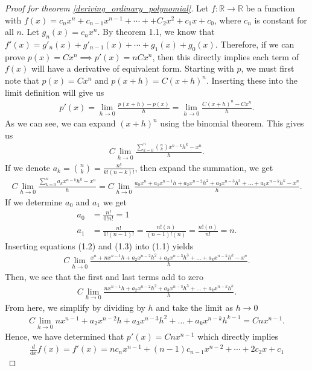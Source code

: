 \begin{proof}[Proof for theorem \ref{deriving_ordinary_polynomial}]
	Let $f:\mathbb{R}\rightarrow\mathbb{R}$ be a function with $f(x)=c_nx^n+c_{n-1}x^{n-1}+\cdots++C_2x^2+c_1x+c_0$, where $c_n$ is constant for all $n$. Let $g_n(x)=c_nx^n$. By theorem 1.1, we know that $f'(x)=g'_n(x)+g'_{n-1}(x)+\cdots+g_1(x)+g_0(x)$. Therefore, if we can prove $p(x)=Cx^n\implies p'(x)=nCx^n$, then this directly implies each term of $f(x)$ will have a derivative of equivalent form.
	Starting with $p$, we must first note that $p(x)=Cx^n$ and $p(x+h)=C(x+h)^n$. Inserting these into the limit definition will give us 
	\begin{align*}
	p'(x) = \lim_{h\to0} \frac{p(x+h)-p(x)}{h} = \lim_{h\to0} \frac{C(x+h)^n-Cx^n}{h}.
	\end{align*}
	As we can see, we can expand $(x+h)^n$ using the binomial theorem. This gives us
	\begin{align*}
	C\lim_{h\to0} \frac{\sum\limits_{k=0}^{n}{{n}\choose{k}}x^{n-k}h^k-x^n}{h}.
	\end{align*}
	If we denote $a_k={{n}\choose{k}}=\frac{n!}{k!(n-k)!}$, then expand the summation, we get
	\begin{align}
	C\lim_{h\to0}\frac{\sum\limits_{k=0}^{n}a_kx^{n-k}h^k-x^n}{h}=C\lim_{h\to0}\frac{a_0x^{n}+a_1x^{n-1}h+a_2x^{n-2}h^2+a_3x^{n-3}h^3+\dots+a_kx^{n-k}h^k-x^n}{h}.
	\end{align}
	If we determine $a_0$ and $a_1$ we get
	\begin{align}
	a_0 &=\frac{n!}{0!n!}=1 \\
	a_1 &=\frac{n!}{1!(n-1)!} =\frac{n!(n)}{(n-1)!(n)}=\frac{n!(n)}{n!}=n.
	\end{align}
	Inserting equations (1.2) and (1.3) into (1.1) yields
	\begin{align*}
	C\lim_{h\to0}\frac{x^n+nx^{n-1}h+a_2x^{n-2}h^2+a_3x^{n-3}h^3+\dots+a_kx^{n-k}h^k-x^n}{h}.
	\end{align*}
	Then, we see that the first and last terms add to zero
	\begin{align*}
	C\lim_{h\to0}\frac{nx^{n-1}h+a_2x^{n-2}h^2+a_3x^{n-3}h^3+\dots+a_kx^{n-k}h^k}{h}.
	\end{align*}
	From here, we simplify by dividing by $h$ and take the limit as $h \to 0$
	\begin{align*}
	C\lim_{h\to0}nx^{n-1}+a_2x^{n-2}h+a_3x^{n-3}h^2+\dots+a_kx^{n-k}h^{k-1}=Cnx^{n-1}.
	\end{align*}
	Hence, we have determined that $p'(x)=Cnx^{n-1}$ which directly implies
	\begin{align*}
	\frac{d}{dx}f(x)=f'(x)=nc_nx^{n-1}+(n-1)c_{n-1}x^{n-2}+\cdots+2c_2x+c_1
	\end{align*}
\end{proof}

